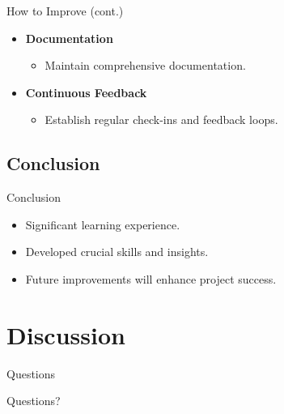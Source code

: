 \documentclass{beamer}
\begin{document}
\begin{frame}{How to Improve (cont.)}
    \begin{itemize}
        \item \textbf{Documentation}
        \begin{itemize}
            \item Maintain comprehensive documentation.
        \end{itemize}
        \item \textbf{Continuous Feedback}
        \begin{itemize}
            \item Establish regular check-ins and feedback loops.
        \end{itemize}
    \end{itemize}
\end{frame}

\subsection{Conclusion}
\begin{frame}{Conclusion}
    \begin{itemize}
        \item Significant learning experience.
        \item Developed crucial skills and insights.
        \item Future improvements will enhance project success.
    \end{itemize}
\end{frame}


\section{Discussion}



\begin{frame}{Questions}
    \begin{center}
        \Huge{Questions?}
    \end{center}
\end{frame}
\end{document}
